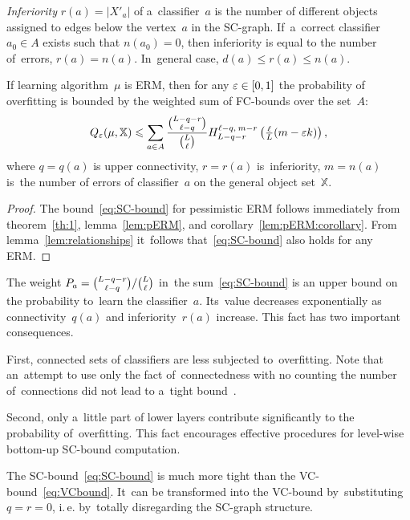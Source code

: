 \documentclass{article}
\let\cite\citep
\def\XX{\mathbb{X}}
\renewcommand{\leq}{\leqslant}
\def\CC_#1^#2{\tbinom{#1}{#2}}
\newcommand{\hypergeom}[5]{{#1}_{#2}^{#4,\:#3}\left(#5\right)}
\newcommand{\Hyper}[4]{\hypergeom{H}{#1}{#2}{#3}{#4}}
\renewcommand{\emph}[1]{\textit{#1}}
\begin{document}
\medskip
\emph{Inferiority} $r(a)=|X'_a|$ of a~classifier~$a$
is the number of different objects assigned to edges below the vertex~$a$ in the SC-graph.
If~a~correct classifier $a_0\in A$ exists such that $n(a_0)=0$,
then inferiority is equal to the number of~errors, $r(a) = n(a)$.
In~general case, $d(a) \leq r(a)\leq n(a)$.

\begin{theorem}[SC-bound]
\label{th:SC-bound}
    If learning algorithm~$\mu$ is ERM, then for any $\varepsilon\in[0,1]$
    the probability of overfitting is bounded by the weighted sum of FC-bounds over the set~$A$:
    \begin{equation}
    \label{eq:SC-bound}
        Q_\eps(\mu,\XX)
        \leq
        \sum_{a\in A}
            \frac{\CC_{L-q-r}^{\ell-q}}{\CC_{L}^{\ell}}
            \Hyper{L-q-r}{m-r}{\ell-q}{\tfrac\ell L (m - \eps k)},
    \end{equation}
    where
    $q = q(a)$ is upper connectivity,\;
    $r = r(a)$ is~inferiority,\;
    $m = n(a)$ is~the number of errors
    of classifier~$a$ on the general object set~$\XX$.
\end{theorem}
\begin{proof}
    The bound~\eqref{eq:SC-bound} for pessimistic ERM
    follows immediately  from
    theorem~\ref{th:1},
    lemma~\ref{lem:pERM},
    and corollary~\ref{lem:pERM:corollary}.
    From lemma~\ref{lem:relationships} it~follows that~\eqref{eq:SC-bound}
    also holds for any ERM.
\end{proof}

The weight
$P_a = {\CC_{L-q-r}^{\ell-q}} / {\CC_{L}^{\ell}}$
in~the sum~\eqref{eq:SC-bound}
is an upper bound on the probability to~learn the classifier~$a$.
Its~value  decreases exponentially as connectivity~$q(a)$ and inferiority~$r(a)$ increase.
This fact has two important consequences.

First, connected sets of classifiers are less subjected to~overfitting.
Note that an~attempt to use only the fact of~connectedness
with no counting the number of~connections
did not lead to a~tight bound~\cite{sill98phd}.

Second, only a~little part of lower layers contribute significantly to the probability of~overfitting.
This fact encourages effective procedures for level-wise bottom-up SC-bound computation.

The SC-bound~\eqref{eq:SC-bound} is much more tight than the VC-bound~\eqref{eq:VCbound}.
It~can be transformed into the VC-bound by~substituting $q = r = 0$,
i.\,e. by~totally disregarding the SC-graph structure.
\end{document}
